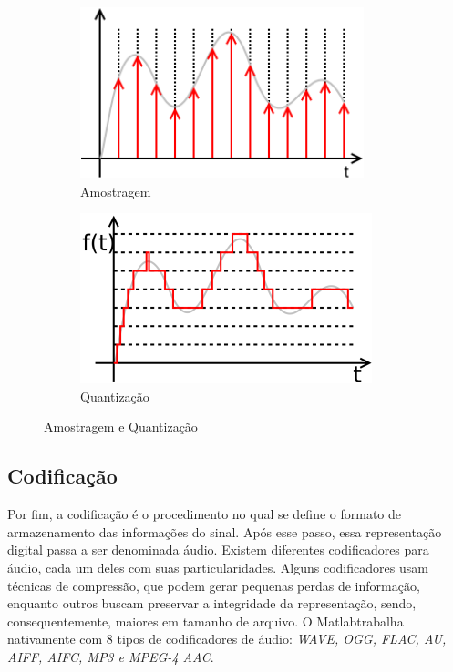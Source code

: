 \begin{figure}[h]
	\begin{subfigure}{0.5\textwidth}
		\centering
		\includegraphics[scale=0.4]{pasta1_figuras/amostragem.png}
		\caption{Amostragem} \label{fig-sampling}
	\end{subfigure}
	\hspace*{\fill} %
	\begin{subfigure}{0.5\textwidth}
		\centering
		\includegraphics[scale=0.75]{pasta1_figuras/quantization.png}
		\caption{Quantização} \label{fig-quantizacao}
	\end{subfigure}
	\caption{Amostragem e Quantização}
\end{figure}

\subsection{Codificação}
Por fim, a codificação é o procedimento no qual se define o formato de armazenamento das informações do sinal. Após esse passo, essa representação digital passa a ser denominada áudio. Existem diferentes codificadores para áudio, cada um deles com suas particularidades. Alguns codificadores usam técnicas de compressão, que podem gerar pequenas perdas de informação, enquanto outros buscam preservar a integridade da representação, sendo, consequentemente, maiores em tamanho de arquivo. O Matlab\rreg trabalha nativamente com 8 tipos de codificadores de áudio: \textit{WAVE, OGG, FLAC, AU, AIFF, AIFC, MP3 e MPEG-4 AAC}\cite{mathworks2018audioread}.


